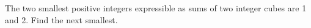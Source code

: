 The two smallest positive integers expressible as sums of two integer cubes are 1 and 2. Find the next smallest.
